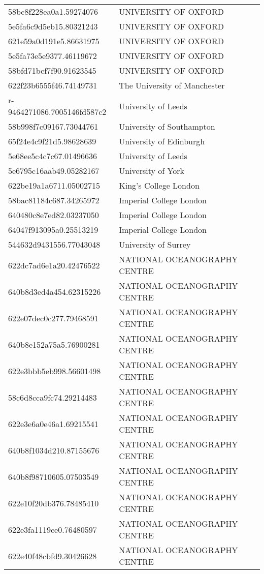 \begin{tabular}{ll}
58bc8f228ea0a1.59274076 & UNIVERSITY OF OXFORD \\
5e5fa6c9d5eb15.80321243 & UNIVERSITY OF OXFORD \\
621e59a0d191e5.86631975 & UNIVERSITY OF OXFORD \\
5e5fa73e5e9377.46119672 & UNIVERSITY OF OXFORD \\
58bfd71bcf7f90.91623545 & UNIVERSITY OF OXFORD \\
622f23b6555f46.74149731 & The University of Manchester \\
r-9464271086.7005146fd587c2 & University of Leeds \\
58b998f7c09167.73044761 & University of Southampton \\
65f24e4c9f21d5.98628639 & University of Edinburgh \\
5e68ee5c4c7c67.01496636 & University of Leeds \\
5e6795c16aab49.05282167 & University of York \\
622be19a1a6711.05002715 & King's College London \\
58bac81184c687.34265972 & Imperial College London \\
640480c8e7ed82.03237050 & Imperial College London \\
64047f913095a0.25513219 & Imperial College London \\
544632d9431556.77043048 & University of Surrey \\
622dc7ad6e1a20.42476522 & NATIONAL OCEANOGRAPHY CENTRE \\
640b8d3ed4a454.62315226 & NATIONAL OCEANOGRAPHY CENTRE \\
622e07dec0c277.79468591 & NATIONAL OCEANOGRAPHY CENTRE \\
640b8e152a75a5.76900281 & NATIONAL OCEANOGRAPHY CENTRE \\
622e3bbb5eb998.56601498 & NATIONAL OCEANOGRAPHY CENTRE \\
58c6d8cca9fc74.29214483 & NATIONAL OCEANOGRAPHY CENTRE \\
622e3e6a0e46a1.69215541 & NATIONAL OCEANOGRAPHY CENTRE \\
640b8f1034d210.87155676 & NATIONAL OCEANOGRAPHY CENTRE \\
640b8f98710605.07503549 & NATIONAL OCEANOGRAPHY CENTRE \\
622e10f20db376.78485410 & NATIONAL OCEANOGRAPHY CENTRE \\
622e3fa1119ce0.76480597 & NATIONAL OCEANOGRAPHY CENTRE \\
622e40f48cbfd9.30426628 & NATIONAL OCEANOGRAPHY CENTRE \\

\end{tabular}
